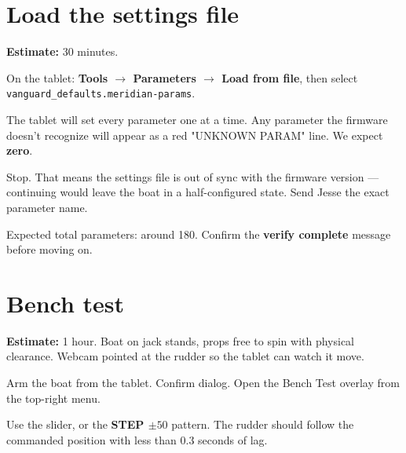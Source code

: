 \documentclass[10pt,a4paper]{article}
\begin{document}
\begin{safetybox}
\end{safetybox}

\section{Load the settings file}
\textbf{Estimate:} 30 minutes.

\begin{stepbox}
On the tablet: \textbf{Tools $\rightarrow$ Parameters $\rightarrow$ Load from file},
then select \texttt{vanguard\_defaults.meridian-params}.

The tablet will set every parameter one at a time. Any parameter the
firmware doesn't recognize will appear as a red "UNKNOWN PARAM" line.
We expect \textbf{zero}.
\end{stepbox}

\begin{warnbox}
Stop. That means the settings file is out of sync with the firmware
version --- continuing would leave the boat in a half-configured
state. Send Jesse the exact parameter name.
\end{warnbox}

Expected total parameters: around 180. Confirm the \textbf{verify complete}
message before moving on.

\section{Bench test}
\textbf{Estimate:} 1 hour. Boat on jack stands, props free to spin with
physical clearance. Webcam pointed at the rudder so the tablet can
watch it move.

\begin{stepbox}
Arm the boat from the tablet. Confirm dialog. Open the Bench Test
overlay from the top-right menu.
\end{stepbox}

\begin{stepbox}
Use the slider, or the \textbf{STEP $\pm50$} pattern. The rudder
should follow the commanded position with less than 0.3 seconds of lag.
\end{stepbox}
\end{document}
